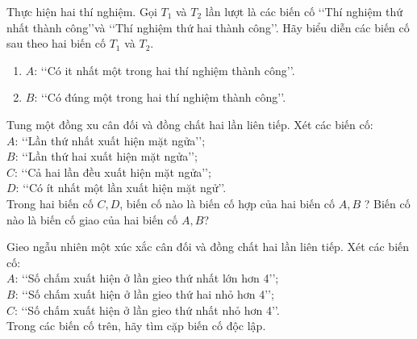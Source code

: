 \begin{bt}%
	Thực hiện hai thí nghiệm. Gọi $T_1$ và $T_2$ lần lượt là các biến cố \lq\lq  Thí nghiệm thứ nhất thành công\rq\rq và \lq\lq  Thí nghiệm thứ hai thành công\rq\rq. Hãy biểu diễn các biến cố sau theo hai biến cố $T_1$ và $T_2$.
	\begin{enumerate}
	\item $A$: \lq\lq  Có it nhất một trong hai thí nghiệm thành công\rq\rq.
	\item $B$: \lq\lq  Có đúng một trong hai thí nghiệm thành công\rq\rq.
	\end{enumerate}
\end{bt}
\begin{bt}%
	Tung một đồng xu cân đối và đồng chất hai lần liên tiếp. Xét các biến cố:\\
	$A$: \lq\lq  Lần thứ nhất xuất hiện mặt ngửa\rq\rq;\\
	$B$: \lq\lq  Lần thứ hai xuất hiện mặt ngửa\rq\rq;\\
	$C$: \lq\lq  Cả hai lần đều xuất hiện mặt ngửa\rq\rq;\\
	$D$: \lq\lq  Có ít nhất một lần xuất hiện mặt ngử\rq\rq.\\
	Trong hai biến cố $C, D$, biến cố nào là biến cố hợp của hai biến cố $A, B$ ? Biến cố nào là biến cố giao của hai biến cố $A, B$?
\end{bt}
\begin{bt}%
	Gieo ngẫu nhiên một xúc xắc cân đối và đồng chất hai lần liên tiếp. Xét các biến cố:\\
	$A$: \lq\lq  Số chấm xuất hiện ở lần gieo thứ nhất lớn hơn 4\rq\rq ;\\
	$B$: \lq\lq  Số chấm xuất hiện ở lần gieo thứ hai nhỏ hơn 4\rq\rq ;\\
	$C$: \lq\lq  Số chấm xuất hiện ở lần gieo thứ nhất nhỏ hơn 4\rq\rq.\\
	Trong các biến cố trên, hãy tìm cặp biến cố độc lập.
\end{bt}
